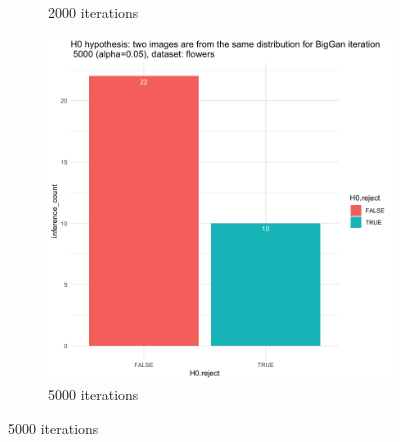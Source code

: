 \documentclass{article}
\begin{document}
\begin{figure}[h!]
\begin{subfigure}[b]{0.3\textwidth}
         \caption{2000 iterations}
     \end{subfigure}
     \hfill
     \begin{subfigure}[b]{0.3\textwidth}
         \centering
         \includegraphics[width=\textwidth]{kmmd_figures/biggan_flower_5000.png}
         \caption{5000 iterations}
     \end{subfigure}
\end{figure}
\end{document}
